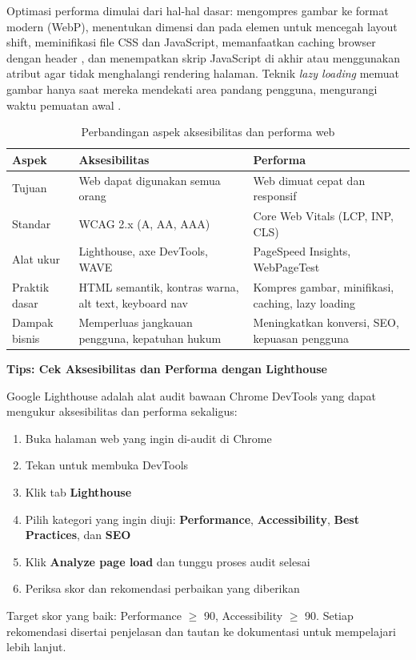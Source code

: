 Optimasi performa dimulai dari hal-hal dasar: mengompres gambar ke format modern (WebP), menentukan dimensi  dan  pada elemen  untuk mencegah layout shift, meminifikasi file CSS dan JavaScript, memanfaatkan caching browser dengan header , dan menempatkan skrip JavaScript di akhir  atau menggunakan atribut  agar tidak menghalangi rendering halaman. Teknik \textit{lazy loading} memuat gambar hanya saat mereka mendekati area pandang pengguna, mengurangi waktu pemuatan awal \cite{mdnToolsTesting}.

\begin{table}[H]
\centering
\begin{tabular}{|P{2.5cm}|P{4.5cm}|P{4.5cm}|}
\hline
\textbf{Aspek} & \textbf{Aksesibilitas} & \textbf{Performa} \\
\hline
Tujuan & Web dapat digunakan semua orang & Web dimuat cepat dan responsif \\
\hline
Standar & WCAG 2.x (A, AA, AAA) & Core Web Vitals (LCP, INP, CLS) \\
\hline
Alat ukur & Lighthouse, axe DevTools, WAVE & PageSpeed Insights, WebPageTest \\
\hline
Praktik dasar & HTML semantik, kontras warna, alt text, keyboard nav & Kompres gambar, minifikasi, caching, lazy loading \\
\hline
Dampak bisnis & Memperluas jangkauan pengguna, kepatuhan hukum & Meningkatkan konversi, SEO, kepuasan pengguna \\
\hline
\end{tabular}
\caption{Perbandingan aspek aksesibilitas dan performa web}
\end{table}

\begin{catatan}
\textbf{Tips: Cek Aksesibilitas dan Performa dengan Lighthouse}

Google Lighthouse adalah alat audit bawaan Chrome DevTools yang dapat mengukur aksesibilitas dan performa sekaligus:
\begin{enumerate}
  \item Buka halaman web yang ingin di-audit di Chrome
  \item Tekan  untuk membuka DevTools
  \item Klik tab \textbf{Lighthouse}
  \item Pilih kategori yang ingin diuji: \textbf{Performance}, \textbf{Accessibility}, \textbf{Best Practices}, dan \textbf{SEO}
  \item Klik \textbf{Analyze page load} dan tunggu proses audit selesai
  \item Periksa skor dan rekomendasi perbaikan yang diberikan
\end{enumerate}
Target skor yang baik: Performance $\geq$ 90, Accessibility $\geq$ 90. Setiap rekomendasi disertai penjelasan dan tautan ke dokumentasi untuk mempelajari lebih lanjut.
\end{catatan}

